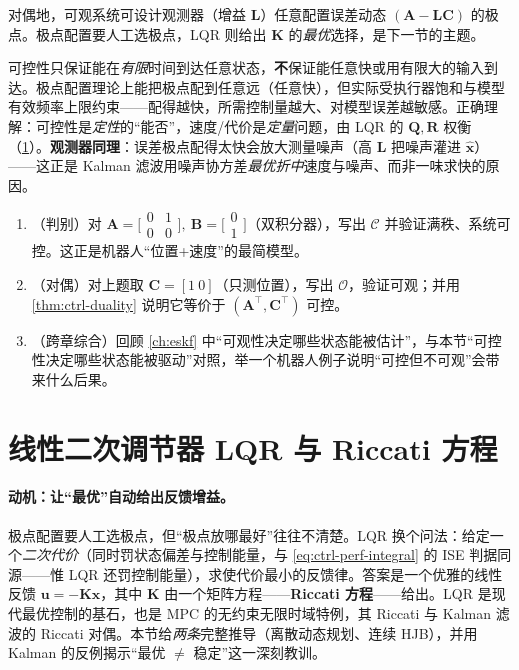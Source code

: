 对偶地，可观系统可设计观测器（增益 $\mathbf{L}$）任意配置误差动态 $(\mathbf{A}-\mathbf{L}\mathbf{C})$ 的极点。极点配置要人工选极点，LQR 则给出 $\mathbf{K}$ 的\emph{最优}选择，是下一节的主题。

\begin{pitfall}
可控性只保证能在\emph{有限}时间到达任意状态，\textbf{不}保证能任意快或用有限大的输入到达。极点配置理论上能把极点配到任意远（任意快），但实际受执行器饱和与模型有效频率上限约束——配得越快，所需控制量越大、对模型误差越敏感。正确理解：可控性是\emph{定性}的“能否”，速度/代价是\emph{定量}问题，由 LQR 的 $\mathbf{Q},\mathbf{R}$ 权衡（\cref{sec:ctrl-lqr}）。\textbf{观测器同理}：误差极点配得太快会放大测量噪声（高 $\mathbf{L}$ 把噪声灌进 $\hat{\mathbf{x}}$）——这正是 Kalman 滤波用噪声协方差\emph{最优折中}速度与噪声、而非一味求快的原因。
\end{pitfall}

\begin{practice}
\begin{enumerate}
  \item （判别）对 $\mathbf{A}=\big[\begin{smallmatrix}0&1\\0&0\end{smallmatrix}\big],\ \mathbf{B}=\big[\begin{smallmatrix}0\\1\end{smallmatrix}\big]$（双积分器），写出 $\mathcal{C}$ 并验证满秩、系统可控。这正是机器人“位置+速度”的最简模型。
  \item （对偶）对上题取 $\mathbf{C}=[1\ 0]$（只测位置），写出 $\mathcal{O}$，验证可观；并用 \cref{thm:ctrl-duality} 说明它等价于 $(\mathbf{A}^\top,\mathbf{C}^\top)$ 可控。
  \item （跨章综合）回顾 \cref{ch:eskf} 中“可观性决定哪些状态能被估计”，与本节“可控性决定哪些状态能被驱动”对照，举一个机器人例子说明“可控但不可观”会带来什么后果。
\end{enumerate}
\end{practice}

\section{线性二次调节器 LQR 与 Riccati 方程}
\label{sec:ctrl-lqr}

\paragraph{动机：让“最优”自动给出反馈增益。}
极点配置要人工选极点，但“极点放哪最好”往往不清楚。LQR 换个问法：给定一个\emph{二次代价}（同时罚状态偏差与控制能量，与 \cref{eq:ctrl-perf-integral} 的 ISE 判据同源——惟 LQR 还罚控制能量），求使代价最小的反馈律。答案是一个优雅的线性反馈 $\mathbf{u}=-\mathbf{K}\mathbf{x}$，其中 $\mathbf{K}$ 由一个矩阵方程——\textbf{Riccati 方程}——给出。LQR 是现代最优控制的基石，也是 MPC 的无约束无限时域特例，其 Riccati 与 Kalman 滤波的 Riccati 对偶。本节给\emph{两条}完整推导（离散动态规划、连续 HJB），并用 Kalman 的反例揭示“最优 $\ne$ 稳定”这一深刻教训。

